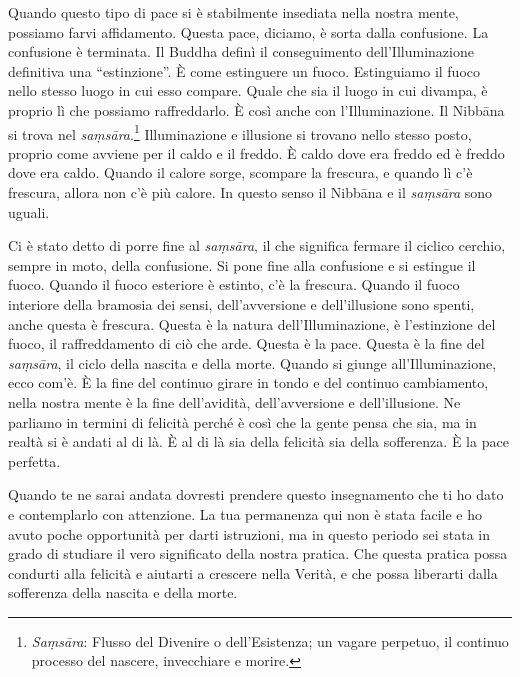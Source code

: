Quando questo tipo di pace si è stabilmente insediata nella nostra
mente, possiamo farvi affidamento. Questa pace, diciamo, è sorta dalla
confusione. La confusione è terminata. Il Buddha definì il conseguimento
dell'Illuminazione definitiva una ``estinzione''. È come estinguere un
fuoco. Estinguiamo il fuoco nello stesso luogo in cui esso compare.
Quale che sia il luogo in cui divampa, è proprio lì che possiamo
raffreddarlo. È così anche con l'Illuminazione. Il Nibbāna si
trova nel \emph{saṃsāra}.\footnote{\emph{Saṃsāra}: Flusso del Divenire o
  dell'Esistenza; un vagare perpetuo, il continuo processo del nascere,
  invecchiare e morire.} Illuminazione e illusione si trovano nello
stesso posto, proprio come avviene per il caldo e il freddo. È caldo
dove era freddo ed è freddo dove era caldo. Quando il calore sorge,
scompare la frescura, e quando lì c'è frescura, allora non c'è più
calore. In questo senso il Nibbāna e il \emph{saṃsāra} sono
uguali.

Ci è stato detto di porre fine al \emph{saṃsāra}, il che significa
fermare il ciclico cerchio, sempre in moto, della confusione. Si pone
fine alla confusione e si estingue il fuoco. Quando il fuoco esteriore è
estinto, c'è la frescura. Quando il fuoco interiore della bramosia dei
sensi, dell'avversione e dell'illusione sono spenti, anche questa è
frescura. Questa è la natura dell'Illuminazione, è l'estinzione del
fuoco, il raffreddamento di ciò che arde. Questa è la pace. Questa è la
fine del \emph{saṃsāra}, il ciclo della nascita e della morte. Quando si
giunge all'Illuminazione, ecco com'è. È la fine del continuo girare in
tondo e del continuo cambiamento, nella nostra mente è la fine
dell'avidità, dell'avversione e dell'illusione. Ne parliamo in termini
di felicità perché è così che la gente pensa che sia, ma in realtà si è
andati al di là. È al di là sia della felicità sia della sofferenza. È
la pace perfetta.

Quando te ne sarai andata dovresti prendere questo insegnamento che ti
ho dato e contemplarlo con attenzione. La tua permanenza qui non è stata
facile e ho avuto poche opportunità per darti istruzioni, ma in questo
periodo sei stata in grado di studiare il vero significato della nostra
pratica. Che questa pratica possa condurti alla felicità e aiutarti a
crescere nella Verità, e che possa liberarti dalla sofferenza della
nascita e della morte.

